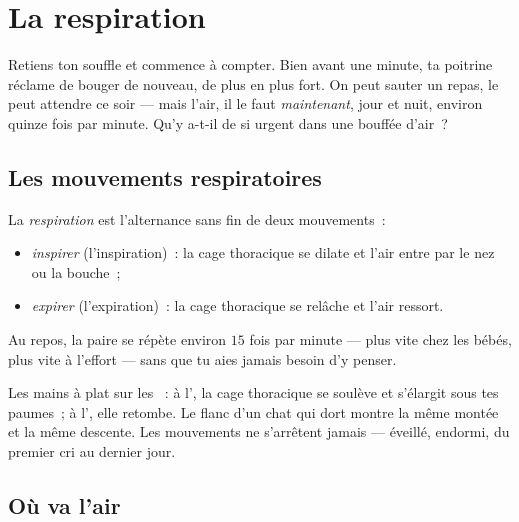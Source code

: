 \chapter{La respiration}\label{ch:g4:breathing}

Retiens ton souffle et commence à compter. Bien avant une minute, ta
poitrine réclame de bouger de nouveau, de plus en plus fort. On peut
sauter un repas, le  peut attendre ce soir --- mais l'air, il
le faut \emph{maintenant}, jour et nuit, environ quinze fois par
minute. Qu'y a-t-il de si urgent dans une bouffée d'air~?

\section{Les mouvements respiratoires}

\begin{definition}\label{def:g4:breathing:movements}
La \emph{respiration} est l'alternance sans fin
de deux mouvements~:
\begin{itemize}
  \item \emph{inspirer} (l'inspiration)~: la cage
        thoracique se dilate et l'air entre par le nez ou la
        bouche~;
  \item \emph{expirer} (l'expiration)~: la cage
        thoracique se relâche et l'air ressort.
\end{itemize}
Au repos, la paire se répète environ $15$ fois par minute --- plus
vite chez les bébés, plus vite à l'effort --- sans que tu aies
jamais besoin d'y penser.
\end{definition}

\begin{example}\label{ex:g4:breathing:watch}
Les mains à plat sur les ~: à l', la cage thoracique
se soulève et s'élargit sous tes paumes~; à l', elle
retombe. Le flanc d'un chat qui dort montre la même montée et la
même descente. Les mouvements ne s'arrêtent jamais --- éveillé,
endormi, du premier cri au dernier jour.
\end{example}

\section{Où va l'air}

